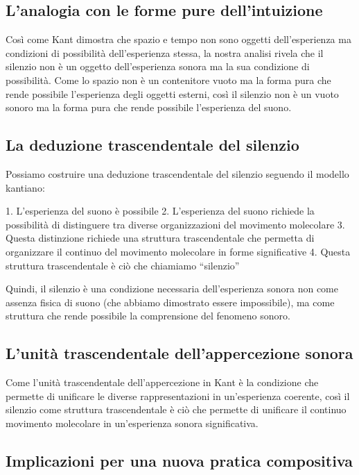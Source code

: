 \documentclass[a4paper,11pt]{article}
\begin{document}
\subsection{L'analogia con le forme pure
dell'intuizione}\label{lanalogia-con-le-forme-pure-dellintuizione}

Così come Kant dimostra che spazio e tempo non sono oggetti
dell'esperienza ma condizioni di possibilità dell'esperienza stessa, la
nostra analisi rivela che il silenzio non è un oggetto dell'esperienza
sonora ma la sua condizione di possibilità. Come lo spazio non è un
contenitore vuoto ma la forma pura che rende possibile l'esperienza
degli oggetti esterni, così il silenzio non è un vuoto sonoro ma la
forma pura che rende possibile l'esperienza del suono.

\subsection{La deduzione trascendentale del
silenzio}\label{la-deduzione-trascendentale-del-silenzio}

Possiamo costruire una deduzione trascendentale del silenzio seguendo il
modello kantiano:

1. L'esperienza del suono è possibile 2. L'esperienza del suono richiede
la possibilità di distinguere tra diverse organizzazioni del movimento
molecolare 3. Questa distinzione richiede una struttura trascendentale
che permetta di organizzare il continuo del movimento molecolare in
forme significative 4. Questa struttura trascendentale è ciò che
chiamiamo ``silenzio''

Quindi, il silenzio è una condizione necessaria dell'esperienza sonora
non come assenza fisica di suono (che abbiamo dimostrato essere
impossibile), ma come struttura che rende possibile la comprensione del
fenomeno sonoro.

\subsection{L'unità trascendentale dell'appercezione
sonora}\label{lunituxe0-trascendentale-dellappercezione-sonora}

Come l'unità trascendentale dell'appercezione in Kant è la condizione
che permette di unificare le diverse rappresentazioni in un'esperienza
coerente, così il silenzio come struttura trascendentale è ciò che
permette di unificare il continuo movimento molecolare in un'esperienza
sonora significativa.

\subsection{Implicazioni per una nuova pratica
compositiva}\label{implicazioni-per-una-nuova-pratica-compositiva}
\end{document}
